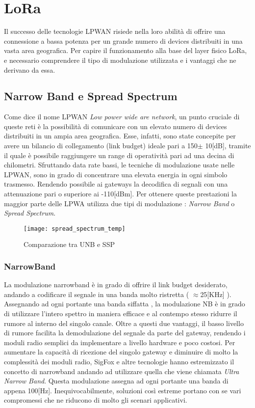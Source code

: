 \chapter{LoRa}
Il successo delle tecnologie LPWAN risiede nella loro abilità di offrire una
connessione a bassa potenza per un grande numero di devices distribuiti in una
vasta area geografica. Per capire il funzionamento alla base del layer fisico
LoRa, e necessario comprendere il tipo di modulazione utilizzata e i vantaggi
che ne derivano da essa.

\section{Narrow Band e Spread Spectrum}
Come dice il nome LPWAN \emph{Low power wide are network}, un punto cruciale di queste reti è la possibilità di
comunicare con un elevato numero di devices distribuiti in un ampia area
geografica. Esse, infatti, sono state concepite per avere un bilancio di
collegamento (link budget) ideale  pari a 150$\pm$ 10[dB], 
tramite il  quale è possibile raggiungere un range di operatività
pari ad una decina di chilometri. Sfruttando  data rate bassi, le tecniche di
modulazione usate nelle LPWAN, sono in grado di concentrare una elevata energia in
ogni simbolo trasmesso. Rendendo possibile ai gateways la decodifica di 
segnali con una attenuazione pari o superiore ai -110[dBm]. Per ottenere queste
prestazioni la maggior parte delle LPWA utilizza due tipi di modulazione :
\emph{Narrow Band} o \emph{Spread Spectrum}.

\begin{figure}[h]
\centering 
\texttt{[image: spread\_spectrum\_temp]}
\caption{Comparazione tra UNB e SSP}
\end{figure}

\subsection{NarrowBand}
La modulazione narrowband è in grado di offrire il link budget desiderato,
andando a codificare il segnale in una banda molto ristretta ( $\approx$25[KHz]
).  Assegnando ad ogni  portante una banda siffatta , la modulazione NB è in
grado di utilizzare l'intero spettro in maniera efficace e al contempo stesso
ridurre il rumore al interno del singolo canale. Oltre a questi due vantaggi, il basso
livello di rumore facilita la demodulazione del segnale da parte del gateway, rendendo i
moduli radio semplici da implementare a livello hardware e poco costosi.  Per aumentare la capacità di ricezione
del  singolo gateway  e diminuire di molto la  complessità dei moduli radio,
SigFox e altre tecnologie hanno estremizzato il concetto di narrowband andando ad
utilizzare quella che viene chiamata \emph{Ultra Narrow Band}.
Questa modulazione assegna ad ogni portante una banda di appena 100[Hz]. 
Inequivocabilmente, soluzioni così estreme portano con se vari  compromessi che
ne riducono di molto gli scenari applicativi.

